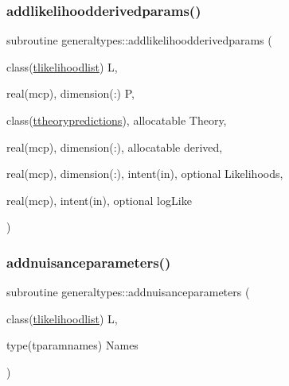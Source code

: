 \subsubsection{\texorpdfstring{addlikelihoodderivedparams()}{addlikelihoodderivedparams()}}
{\footnotesize\ttfamily subroutine generaltypes\+::addlikelihoodderivedparams (\begin{DoxyParamCaption}\item[{class(\mbox{\hyperlink{structgeneraltypes_1_1tlikelihoodlist}{tlikelihoodlist}})}]{L,  }\item[{real(mcp), dimension(\+:)}]{P,  }\item[{class(\mbox{\hyperlink{structgeneraltypes_1_1ttheorypredictions}{ttheorypredictions}}), allocatable}]{Theory,  }\item[{real(mcp), dimension(\+:), allocatable}]{derived,  }\item[{real(mcp), dimension(\+:), intent(in), optional}]{Likelihoods,  }\item[{real(mcp), intent(in), optional}]{log\+Like }\end{DoxyParamCaption})\hspace{0.3cm}{\ttfamily [private]}}

\mbox{\label{namespacegeneraltypes_af520b2d286223bb2ce63b94b5c1349b6}} 
\subsubsection{\texorpdfstring{addnuisanceparameters()}{addnuisanceparameters()}}
{\footnotesize\ttfamily subroutine generaltypes\+::addnuisanceparameters (\begin{DoxyParamCaption}\item[{class(\mbox{\hyperlink{structgeneraltypes_1_1tlikelihoodlist}{tlikelihoodlist}})}]{L,  }\item[{type(tparamnames)}]{Names }\end{DoxyParamCaption})\hspace{0.3cm}{\ttfamily [private]}}

\mbox{\label{namespacegeneraltypes_a67700a58507d793526ec1958d512cf71}} 
